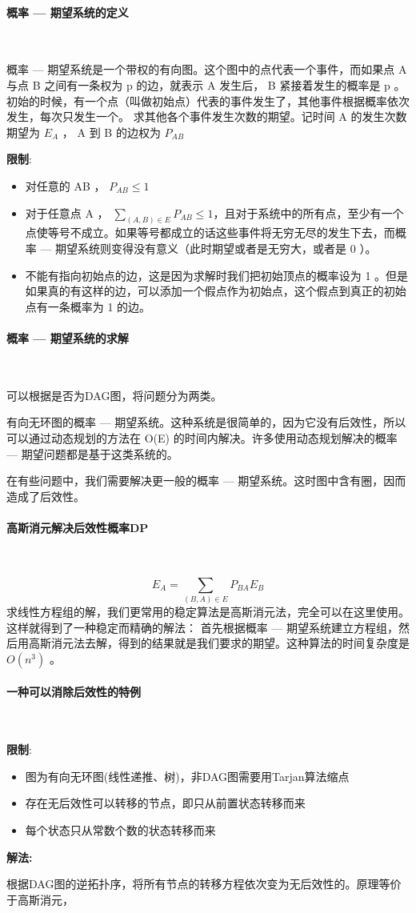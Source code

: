 \paragraph{概率 — 期望系统的定义}~{}
\par
概率 — 期望系统是一个带权的有向图。这个图中的点代表一个事件，而如果点 A 与点 B 之间有一条权为 p 的边，就表示 A 发生后， B 紧接着发生的概率是 p 。
初始的时候，有一个点（叫做初始点）代表的事件发生了，其他事件根据概率依次发生，每次只发生一个。
求其他各个事件发生次数的期望。记时间 A 的发生次数期望为 $E_{A}$ ， A 到 B 的边权为 $P_{AB}$ \par
\textbf{限制}:
\begin{itemize}
    \item 对任意的 AB ， $P_{AB} \leq 1$
    \item 对于任意点 A ， $ \sum_{(A,B)\in E}{P_{AB}} \leq 1$，且对于系统中的所有点，至少有一个点使等号不成立。如果等号都成立的话这些事件将无穷无尽的发生下去，而概率 — 期望系统则变得没有意义（此时期望或者是无穷大，或者是 0 ）。
    \item 不能有指向初始点的边，这是因为求解时我们把初始顶点的概率设为 1 。但是如果真的有这样的边，可以添加一个假点作为初始点，这个假点到真正的初始点有一条概率为 1 的边。
\end{itemize}
\paragraph{概率 — 期望系统的求解}~{}
\par
可以根据是否为DAG图，将问题分为两类。\par
有向无环图的概率 — 期望系统。这种系统是很简单的，因为它没有后效性，所以可以通过动态规划的方法在 O(E) 的时间内解决。许多使用动态规划解决的概率 — 期望问题都是基于这类系统的。\par
在有些问题中，我们需要解决更一般的概率 — 期望系统。这时图中含有圈，因而造成了后效性。\par

\paragraph{高斯消元解决后效性概率DP}~{}
\par
$$E_{A} = \sum_{(B,A)\in E}P_{BA} E_{B}$$ 
求线性方程组的解，我们更常用的稳定算法是高斯消元法，完全可以在这里使用。这样就得到了一种稳定而精确的解法：
首先根据概率 — 期望系统建立方程组，然后用高斯消元法去解，得到的结果就是我们要求的期望。这种算法的时间复杂度是 $O(n^3)$ 。

\paragraph{一种可以消除后效性的特例}~{}
\par
\textbf{限制}:
\begin{itemize}
    \item 图为有向无环图(线性递推、树)，非DAG图需要用Tarjan算法缩点
    \item 存在无后效性可以转移的节点，即只从前置状态转移而来
    \item 每个状态只从常数个数的状态转移而来
\end{itemize}\par
\textbf{解法:}\par
根据DAG图的逆拓扑序，将所有节点的转移方程依次变为无后效性的。原理等价于高斯消元，